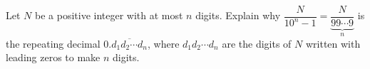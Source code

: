 Let $N$ be a positive integer with at most $n$ digits. Explain why $\dfrac{N}{10^n-1}=\dfrac{N}{\underbrace{99\cdots9}_{n}}$ is the repeating decimal $0.\overline{d_1d_2\cdots d_n}$, where $d_1d_2\cdots d_n$ are the digits of $N$ written with leading zeros to make $n$ digits.
